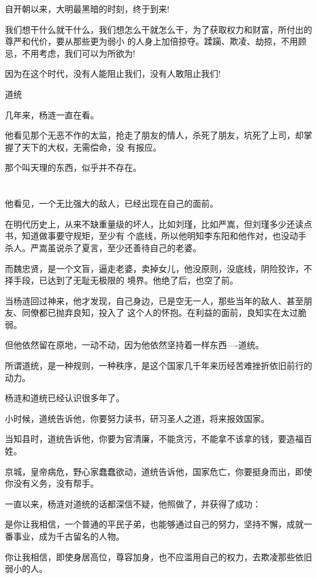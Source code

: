 \documentclass[11pt,a4paper,onecolumn]{article}
\begin{document}
自开朝以来，大明最黑暗的时刻，终于到来!

我们想干什么就干什么，我们想怎么干就怎么干，为了获取权力和财富，所付出的尊严和代价，要从那些更为弱小
的人身上加倍掠夺。蹂躏、欺凌、劫掠，不用顾忌，不用考虑，我们可以为所欲为!

因为在这个时代，没有人能阻止我们，没有人敢阻止我们!

道统

几年来，杨涟一直在看。

他看见那个无恶不作的太监，抢走了朋友的情人，杀死了朋友，坑死了上司，却掌握了天下的大权，无需偿命，没
有报应。

那个叫天理的东西，似乎并不存在。

\section[\thesection]{}

他看见，一个无比强大的敌人，已经出现在自己的面前。

在明代历史上，从来不缺重量级的坏人，比如刘瑾，比如严嵩，但刘瑾多少还读点书，知道做事要守规矩，至少有
个底线，所以他明知李东阳和他作对，也没动手杀人。严嵩虽说杀了夏言，至少还善待自己的老婆。

而魏忠贤，是一个文盲，逼走老婆，卖掉女儿，他没原则，没底线，阴险狡诈，不择手段，已达到了无耻无极限的
境界。他绝了后，也空了前。

当杨涟回过神来，他才发现，自己身边，已是空无一人，那些当年的敌人、甚至朋友、同僚都已抛弃良知，投入了
这个人的怀抱。在利益的面前，良知实在太过脆弱。

但他依然留在原地，一动不动，因为他依然坚持着一样东西----道统。

所谓道统，是一种规则，一种秩序，是这个国家几千年来历经苦难挫折依旧前行的动力。

杨涟和道统已经认识很多年了。

小时候，道统告诉他，你要努力读书，研习圣人之道，将来报效国家。

当知县时，道统告诉他，你要为官清廉，不能贪污，不能拿不该拿的钱，要造福百姓。

京城，皇帝病危，野心家蠢蠢欲动，道统告诉他，国家危亡，你要挺身而出，即使你没有义务，没有帮手。

一直以来，杨涟对道统的话都深信不疑，他照做了，并获得了成功：

是你让我相信，一个普通的平民子弟，也能够通过自己的努力，坚持不懈，成就一番事业，成为千古留名的人物。
　　

你让我相信，即使身居高位，尊容加身，也不应滥用自己的权力，去欺凌那些依旧弱小的人。
\end{document}
